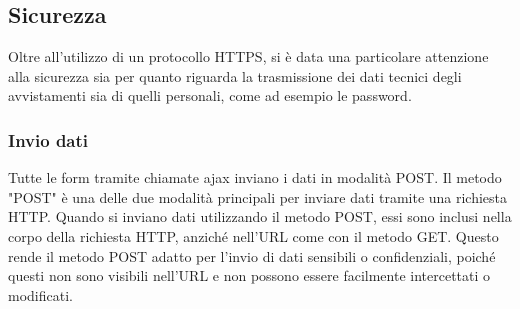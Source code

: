 \documentclass[a4paper,final,12pt]{report}
\begin{document}
\subsection{Sicurezza}
Oltre all'utilizzo di un protocollo HTTPS, si è data una particolare attenzione alla sicurezza sia per quanto riguarda la trasmissione dei dati tecnici degli avvistamenti sia di quelli personali, come ad esempio le password.
\subsubsection{Invio dati} 
Tutte le form tramite chiamate ajax inviano i dati in modalità POST. Il metodo "POST" è una delle due modalità principali per inviare dati tramite una richiesta HTTP. Quando si inviano dati utilizzando il metodo POST, essi sono inclusi nella corpo della richiesta HTTP, anziché nell'URL come con il metodo GET. Questo rende il metodo POST adatto per l'invio di dati sensibili o confidenziali, poiché questi non sono visibili nell'URL e non possono essere facilmente intercettati o modificati.
\end{document}
